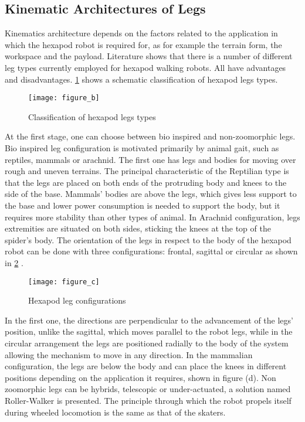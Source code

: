 \subsection{Kinematic Architectures of Legs}
Kinematics architecture depends on the factors related to the application in which the hexapod robot is required for, as for example the terrain form, the workspace and the payload. Literature shows that there is a number of different leg types currently employed for hexapod walking robots. All have advantages and disadvantages. \ref{figure b.png} shows a schematic classification of hexapod legs types.

\begin{figure}[h]
	\centering
	\texttt{[image: figure\_b]}
	\caption{Classification of hexapod legs types}
	\label{figure b.png}

\end{figure}

At the first stage, one can choose between bio inspired and non-zoomorphic legs. Bio inspired leg configuration is motivated primarily by animal gait, such as reptiles, mammals or arachnid. The first one has legs and bodies for moving over rough and uneven terrains. The principal characteristic of the Reptilian type is that the legs are placed on both ends of the protruding body and knees to the side of the base. Mammals’ bodies are above the legs, which gives less support to the base and lower power consumption is needed to support the body, but it requires more stability than other types of animal. In Arachnid configuration, legs extremities are situated on both sides, sticking the knees at the top of the spider’s body. The orientation of the legs in respect to the body of the hexapod robot can be done with three configurations: frontal, sagittal or circular as shown in \ref{figure c.png} .

\begin{figure}[h]
	\centering
	\texttt{[image: figure\_c]}
	\caption{Hexapod leg configurations}
	\label{figure c.png}
\end{figure}

In the first one, the directions are perpendicular to the advancement of the legs’ position, unlike the sagittal, which moves parallel to the robot legs, while in the circular arrangement the legs are positioned radially to the body of the system allowing the mechanism to move in any direction. In the mammalian configuration, the legs are below the body and can place the knees in different positions depending on the application it requires, shown in figure (d). Non zoomorphic legs can be hybrids, telescopic or under-actuated, a solution named Roller-Walker is presented. The principle through which the robot propels itself during wheeled locomotion is the same as that of the skaters.

